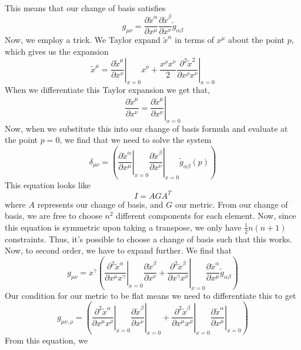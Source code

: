 This means that our change of basis satisfies
\[
 g_{ \mu \nu } = \frac{\partial  \tilde{x } ^ \alpha  }{\partial  x ^ \mu }  
 \frac{\partial  \tilde{ x } ^ \beta  }{\partial  x ^ \nu }  \tilde{ g } _{ \alpha \beta } 
\] Now, we employ a trick. 
We Taylor expand $ \tilde{ x } ^ \alpha  $ in terms of $ x ^ \mu $
about the point $ p$, which gives us the expansion 
 \[
 \tilde{ x } ^ \mu = \left. \frac{\partial \tilde{x } ^ \mu  }{\partial  x ^ \nu }  \right\vert_{ x = 0 }
	 x ^ \nu + \frac{ x ^ \rho x ^ \nu }{ 2 } \left. \frac{\partial  ^ 2 \tilde{x } ^ 2 }{\partial 
		 x ^ \rho   x ^ \nu } \right\vert_{ x= 0 } 
	 \] When we differentiate this 
Taylor expansion we get that, 
\[
 \frac{\partial  \tilde{ x } ^ \mu  }{\partial  x ^ \nu }  = \left.
	 \frac{\partial  \tilde{ x  } ^ \mu  }{\partial  x ^ \nu }  \right\vert_{ x =0 }
\] Now, when we substitute this into 
our change of basis formula and evaluate at the point 
$ p = 0 $, we find that we need to solve the system 
 \[
	 \delta _{ \mu \nu } = \left( \left. \frac{\partial  \tilde{x } ^ \alpha  }{\partial  x ^ \mu } 
			 \right\vert_{  x=0 }
	 \left. \frac{\partial  \tilde{ x } ^ \beta  }{\partial  x ^ \nu }
	 \right\vert_{ x =0 }  \tilde{g  }_{ \alpha \beta } ( p )  \right) 
\] This equation looks like 
\[
 I = A G A ^ T 
\] where $ A $ represents our change of basis, and $ G $ our
metric. From our change of basis, we are free to choose 
$n ^ 2 $ different components for each element. Now, since 
this equation is symmetric upon taking a transpose, 
we only have $ \frac{1}{2 } n ( n + 1)  $  constraints. 
Thus, it's possible to choose a change of basis such that this works. 
Now, to second order, we have to expand further.
We find that 
\[
	g_{ \mu \nu }  = x ^ \gamma \left( \left. \frac{\partial ^ 2 \tilde{x } ^ \alpha   }{\partial x ^ \mu x ^ \gamma  }
		\right\vert_{ x = 0 } \frac{\partial \tilde{x } ^ \beta  }{\partial  x ^ \nu }
		 + \left. \frac{\partial^ 2  \tilde{ x } ^ \beta  }{\partial x ^ \gamma x ^ \nu  }
		 \right\vert_{ x = 0} \frac{\partial  \tilde{x } ^ \alpha  }{\partial  x ^ \mu }
		 \tilde{g}_{ \alpha \beta }
		\right) 
\] Our condition for our metric to be flat means 
we need to differentiate this to get 
\[
	g_{ \mu \nu , \rho  } = \left(  \left. \frac{\partial ^ 2 \tilde{x } ^ \alpha  }{\partial x ^ \mu 
	x ^ \rho }  \right\vert_{ x= 0 }  \left. \frac{\partial  \tilde{ x } ^ \beta  }{\partial  x ^ \nu }
\right \vert_{  x=0}  + \left. \frac{\partial ^ 2 \tilde{x }^ \beta   }{\partial x ^ \mu x ^ \rho }
\right\vert_{ x =0  } \left. \frac{\partial  \tilde{ x }^ \alpha  }{\partial  x ^ \mu }  
\right\vert_{ x = 0 }\right)  
\] From this equation, we 
